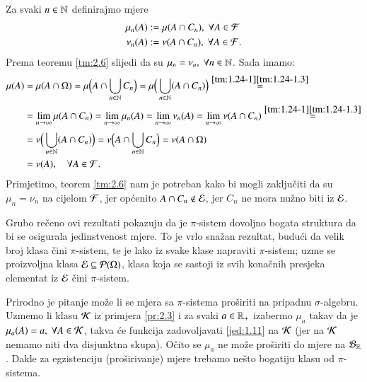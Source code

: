 \begin{rj}[\ref{zad:2.9}]
    Za svaki $n \in \mathbb{N}$ definirajmo mjere
    \begin{equation*}
        \begin{aligned}
            \mu_n (A) &:= \mu (A \cap C_n), \; \forall A \in \mathcal{F}\\
            \nu_n (A) &:= \nu (A \cap C_n), \; \forall A \in \mathcal{F}.
        \end{aligned}
    \end{equation*}
    Prema teoremu \ref{tm:2.6} slijedi da su $\mu_n = \nu_n, \; \forall n \in \mathbb{N}$. Sada imamo:
    \begin{equation*}
        \begin{aligned}
            \mu (A) &= \mu (A \cap \Omega) = \mu \Big( A \cap \bigcup\limits_{n \in \mathbb{N}}^{} C_n \Big) = \mu \Big( \bigcup\limits_{n \in \mathbb{N}}^{} (A \cap C_n) \Big) \overset{\ref{tm:1.24-1} \ref{tm:1.24-1.3}}{=}\\
            &= \lim\limits_{n \to \infty} \mu(A \cap C_n) = \lim\limits_{n \to \infty} \mu_n (A) = \lim\limits_{n \to \infty} \nu_n (A) = \lim\limits_{n \to \infty} \nu (A \cap C_n) \overset{\ref{tm:1.24-1} \ref{tm:1.24-1.3}}{=}\\
            &= \nu \Big( \bigcup\limits_{n \in \mathbb{N}}^{} (A \cap C_n) \Big) = \nu \Big( A \cap \bigcup\limits_{n \in \mathbb{N}}^{} C_n \Big) = \nu(A \cap \Omega)\\
            &= \nu(A), \quad \forall A \in \mathcal{F}.
        \end{aligned}
    \end{equation*}
    Primjetimo, teorem \ref{tm:2.6} nam je potreban kako bi mogli zaklju\v citi da su $\mu_n = \nu_n$ na cijelom $\mathcal{F}$, jer op\' cenito $A \cap C_n \notin \mathcal{E}$, jer $C_n$ ne mora nu\v zno biti iz $\mathcal{E}$.
\end{rj}

\begin{nap} \label{nap:2.10}
    Grubo re\v ceno ovi rezultati pokazuju da je $\pi$-sistem dovoljno bogata struktura da bi se osigurala jedinstvenost mjere.
    To je vrlo sna\v zan rezultat, budu\' ci da velik broj klasa \v cini $\pi$-sistem, te je lako iz svake klase napraviti $\pi$-sistem; uzme se proizvoljna klasa $\mathcal{E} \subseteq \mathcal{P}({\Omega})$, klasa koja se sastoji iz svih kona\v cnih presjeka elementat iz $\mathcal{E}$ \v cini $\pi$-sistem.

    Prirodno je pitanje mo\v ze li se mjera sa $\pi$-sistema pro\v siriti na pripadnu $\sigma$-algebru.
    Uzmemo li klasu $\mathcal{K}$ iz primjera \ref{pr:2.3} i za svaki $a \in \mathbb{R}_+$ izabermo $\mu_a$ takav da je $\mu_a(A) = a, \; \forall A \in \mathcal{K}$, takva \' ce funkcija zadovoljavati \eqref{jed:1.11} na $\mathcal{K}$ (jer na $\mathcal{K}$ nemamo niti dva disjunktna skupa).
    O\v cito se $\mu_a$ ne mo\v ze pro\v siriti do mjere na $\mathcal{B}_{\mathbb{R}}$.
    Dakle za egzistenciju  (pro\v sirivanje) mjere trebamo ne\v sto bogatiju klasu od $\pi$-sistema.
\end{nap}

